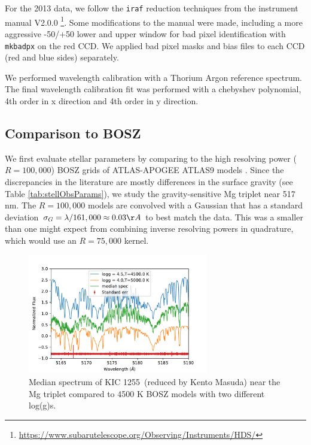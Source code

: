 \documentclass[preprint]{aastex61}
\newcommand{\shStar}{KIC 1255}
\begin{document}
For the 2013 data, we follow the \texttt{iraf} reduction techniques from the instrument manual V2.0.0  \footnote{\url{https://www.subarutelescope.org/Observing/Instruments/HDS/}}.
Some modifications to the manual were made, including a more aggressive -50/+50 lower and upper window for bad pixel identification with \texttt{mkbadpx} on the red CCD.
We applied bad pixel masks and bias files to each CCD (red and blue sides) separately.

We performed wavelength calibration with a Thorium Argon reference spectrum.
The final wavelength calibration fit was performed with a chebyshev polynomial, 4th order in x direction and 4th order in y direction.

\subsection{Comparison to BOSZ}
We first evaluate stellar parameters by comparing to the high resolving power ($R=100,000$) BOSZ grids of ATLAS-APOGEE ATLAS9 models \citep{bohlin2017bosz}.
Since the discrepancies in the literature are mostly differences in the surface gravity (see Table \ref{tab:stellObsParams}), we study the gravity-sensitive Mg triplet near 517 nm.
The $R=100,000$ models are convolved with a Gaussian that has a standard deviation $\sigma_G = \lambda/161,000 \approx 0.03 \AA$ to best match the data.
This was a smaller than one might expect from combining inverse resolving powers in quadrature, which would use an $R=75,000 $ kernel.


\begin{figure}[!hbtp]
\begin{centering}
\includegraphics[width=0.7\textwidth]{images/subaru/bosz_mg_triplet_median_spec_w_5000.pdf}
\caption{Median spectrum of \shStar\ (reduced by Kento Masuda) near the Mg triplet compared to 4500 K BOSZ models with two different log(g)s.}\label{fig:mgTripletBOSZ}
\end{centering}
\end{figure}
\end{document}
